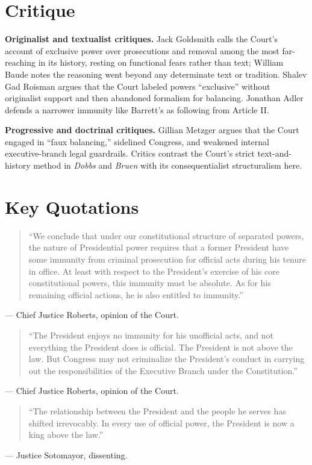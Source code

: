 \documentclass[12pt]{article}
\begin{document}
\section{Critique}

\textbf{Originalist and textualist critiques.} Jack Goldsmith calls the Court's account of exclusive power over prosecutions and removal among the most far-reaching in its history, resting on functional fears rather than text; William Baude notes the reasoning went beyond any determinate text or tradition. Shalev Gad Roisman argues that the Court labeled powers ``exclusive'' without originalist support and then abandoned formalism for balancing. Jonathan Adler defends a narrower immunity like Barrett's as following from Article II.

\textbf{Progressive and doctrinal critiques.} Gillian Metzger argues that the Court engaged in ``faux balancing,'' sidelined Congress, and weakened internal executive-branch legal guardrails. Critics contrast the Court's strict text-and-history method in \textit{Dobbs} and \textit{Bruen} with its consequentialist structuralism here.

\section{Key Quotations}

\begin{quote}
``We conclude that under our constitutional structure of separated powers, the nature of Presidential power requires that a former President have some immunity from criminal prosecution for official acts during his tenure in office. At least with respect to the President's exercise of his core constitutional powers, this immunity must be absolute. As for his remaining official actions, he is also entitled to immunity.''
\end{quote}
\noindent --- Chief Justice Roberts, opinion of the Court.

\begin{quote}
``The President enjoys no immunity for his unofficial acts, and not everything the President does is official. The President is not above the law. But Congress may not criminalize the President's conduct in carrying out the responsibilities of the Executive Branch under the Constitution.''
\end{quote}
\noindent --- Chief Justice Roberts, opinion of the Court.

\begin{quote}
``The relationship between the President and the people he serves has shifted irrevocably. In every use of official power, the President is now a king above the law.''
\end{quote}
\noindent --- Justice Sotomayor, dissenting.
\end{document}

